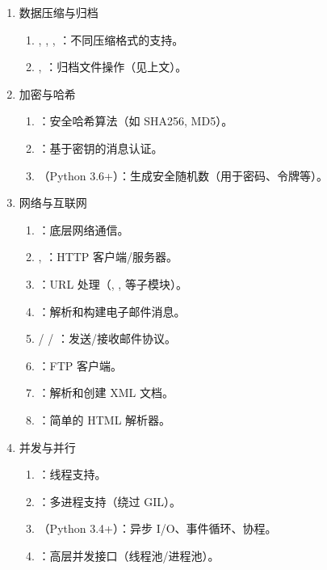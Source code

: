 \begin{enumerate}[label=\arabic*)]
    \item 数据压缩与归档
    \begin{enumerate}[itemindent=1em,label=(\arabic*)]
        \item {}, , , ：不同压缩格式的支持。
        \item {}, ：归档文件操作（见上文）。
    \end{enumerate}

    \item 加密与哈希
    \begin{enumerate}[itemindent=1em,label=(\arabic*)]
        \item {}：安全哈希算法（如 SHA256, MD5）。
        \item {}：基于密钥的消息认证。
        \item {}（Python 3.6+）：生成安全随机数（用于密码、令牌等）。
    \end{enumerate}

    \item 网络与互联网
    \begin{enumerate}[itemindent=1em,label=(\arabic*)]
        \item {}：底层网络通信。
        \item {}, ：HTTP 客户端/服务器。
        \item {}：URL 处理（, ,  等子模块）。
        \item {}：解析和构建电子邮件消息。
        \item {} /  / ：发送/接收邮件协议。
        \item {}：FTP 客户端。
        \item {}：解析和创建 XML 文档。
        \item {}：简单的 HTML 解析器。
    \end{enumerate}

    \item 并发与并行
    \begin{enumerate}[itemindent=1em,label=(\arabic*)]
        \item {}：线程支持。
        \item {}：多进程支持（绕过 GIL）。
        \item {}（Python 3.4+）：异步 I/O、事件循环、协程。
        \item {}：高层并发接口（线程池/进程池）。
    \end{enumerate}


\end{enumerate}
